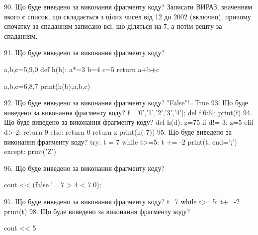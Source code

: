 \documentclass[11pt]{article}
\begin{document}
90. Що буде виведено за виконання фрагменту коду?
Записати ВИРАЗ, значенням якого є список, що складається з цілих чисел від 12 до 2002 (включно), причому спочатку за спаданням записано всі, що діляться на 7, а потім решту за спаданням.

91. Що буде виведено за виконання фрагменту коду?

a,b,c=5,9,0
def h(b):
    a*=3
    b=4
    c=5
    return a+b+c

a,b,c=6,8,7
print(h(b),a,b,c)

92. Що буде виведено за виконання фрагменту коду?
"False"!=True
93. Що буде виведено за виконання фрагменту коду?
f=['0','1','2','3','4']; del f[6:6]; print(f)
94. Що буде виведено за виконання фрагменту коду?
def h(d):
      z=75
      if d!=-3: z=5
      elif d>-2: return 9
      else: return 0
      return z
   print(h(-7))
95. Що буде виведено за виконання фрагменту коду?
try:
    t = 7
    while t>=5:
        t += -2
    print(t, end=';')
except:
    print('Z')

96. Що буде виведено за виконання фрагменту коду?

cout << (false != 7 > 4 < 7.0);

97. Що буде виведено за виконання фрагменту коду?
t=7
   while t>=5: t+=-2
   print(t)
98. Що буде виведено за виконання фрагменту коду?

cout << 5 %
\end{document}
